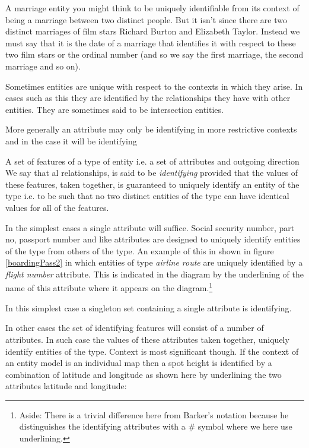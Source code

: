 \mynote
A marriage entity you might think to be uniquely identifiable from its context of being a marriage between two distinct people. But it isn't since there are two distinct marriages of film stars Richard Burton and Elizabeth Taylor. Instead we must say that it is the date of a marriage that identifies it with respect to these two film stars or the ordinal number (and so we say the first marriage, the second marriage and so on).

\mynote Sometimes entities are unique with respect to the contexts in which they arise. In cases such as this they are identified by the relationships they have with other entities. They are sometimes said to be intersection entities.




\mynote
More generally an attribute may only be identifying in more restrictive contexts and in the case it will be identifying 


\mynote A set of features of a type of entity i.e. a set of attributes and outgoing direction We say that al relationships, is said to be \textit{identifying} provided that the values of these features,
taken together, is guaranteed to uniquely identify an entity of the type i.e. to be such that no two distinct entities of the type can have identical values for all of the features. 

\mynote In the simplest cases a single attribute will suffice. Social security number, part no, 
passport number and like attributes are designed to uniquely identify entities of the type from others of the type. 
An example of this 
in  shown in figure \ref{boardingPass2} in which entities of type \textit{airline route} are uniquely identified by a \textit{flight number} attribute.
This is
indicated in the diagram  by the underlining of the name of this attribute where it appears on the diagram.\footnote{Aside: There is a trivial difference here from Barker's notation because he distinguishes the identifying attributes with a \# symbol where we here use  underlining.} 

\mynote In this simplest case  a singleton set containing a single attribute is identifying.

\mynote In other cases the set of identifying features will consist of a number of attributes. In such case  the values of these attributes taken together, uniquely identify entities of the type. Context is most significant though. 
If the context of an entity model is an individual map then a spot height is identified by a combination of latitude and longitude as shown here by underlining the two attributes latitude and longitude: 

